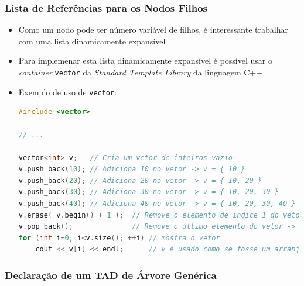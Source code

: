 \documentclass[aspectratio=169]{beamer}
\begin{document}
\begin{frame}[fragile]\frametitle{Lista de Referências para os Nodos Filhos}
\begin{itemize}
	\item Como um nodo pode ter número variável de filhos, é interessante trabalhar com uma lista dinamicamente expansível
	\item Para implemenar esta lista dinamicamente expansível é possível usar o \emph{container} \texttt{vector} da \emph{Standard Template Library} da linguagem C++
	\item Exemplo de uso de \texttt{vector}:
\begin{lstlisting}[language=C++,basicstyle=\ttfamily\tiny]
#include <vector>

// ...

vector<int> v;   // Cria um vetor de inteiros vazio
v.push_back(10); // Adiciona 10 no vetor -> v = { 10 }
v.push_back(20); // Adiciona 20 no vetor -> v = { 10, 20 }
v.push_back(30); // Adiciona 30 no vetor -> v = { 10, 20, 30 }
v.push_back(40); // Adiciona 40 no vetor -> v = { 10, 20, 30, 40 }
v.erase( v.begin() + 1 );  // Remove o elemento de índice 1 do vetor -> v = { 10, 30, 40 }
v.pop_back();              // Remove o último elemento do vetor -> v = { 10, 30 }
for (int i=0; i<v.size(); ++i) // mostra o vetor
    cout << v[i] << endl;      // v é usado como se fosse um arranjo
\end{lstlisting}
\end{itemize}
\end{frame}

\begin{frame}[fragile]\frametitle{Declaração de um TAD de Árvore Genérica}
\fontsize{3pt}{5pt}\selectfont{

}
\end{frame}
\end{document}
